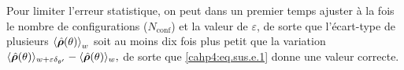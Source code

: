 \medskip

Pour limiter l'erreur statistique, on peut dans un premier temps ajuster à la fois le nombre de configurations ($N_{\text{conf}}$) et la valeur de \( \varepsilon \), de sorte que l’écart-type de plusieurs \( \braket {\hat{\bm{\rho}}(\theta)}_w \) soit au moins dix fois plus petit que la variation
\(
\langle \hat{\bm{\rho}}(\theta) \rangle_{w + \varepsilon \delta_{\theta'}} - \langle \hat{\bm{\rho}}(\theta) \rangle_w,
\)
de sorte que \eqref{cahp4:eq.sus.e.1} donne une valeur correcte.

\medskip





